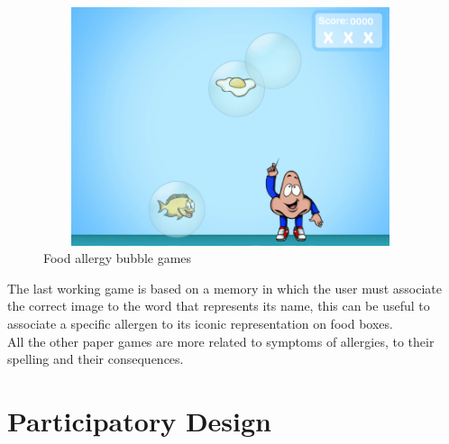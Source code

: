 \begin{figure}[H]
\centering
\includegraphics[width=11cm, height=7cm]{immagini/bubble.png}
\caption{Food allergy bubble games}\label{fig:bubble}
\end{figure}
The last working game is based on a memory in which the user must associate the correct image to the word that represents its name, this can be useful to associate a specific allergen to its iconic representation on food boxes.\\
All the other paper games are more related to symptoms of allergies, to their spelling and their consequences.

\section{Participatory Design}
